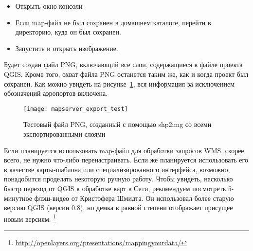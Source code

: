 \begin{itemize}[label=--]
\item Открыть окно консоли
\item Если map-файл не был сохранен в домашнем каталоге, перейти в
директорию, куда он был сохранен.
\item Запустить 
и открыть изображение.
\end{itemize}

Будет создан файл PNG, включающий все слои, содержащиеся в файле проекта
QGIS. Кроме того, охват файла PNG останется таким же, как и когда
проект был сохранен. Как можно увидеть на
рисунке~\ref{fig:mapserver_export_test}, вся информация за исключением
обозначений аэропортов включена.

\begin{figure}[ht]
\centering
  \texttt{[image: mapserver\_export\_test]}
  \caption{Тестовый файл PNG, созданный с помощью shp2img со всеми экспортированными слоями \wincaption}
  \label{fig:mapserver_export_test}
\end{figure}

Если планируется использовать map-файл для обработки запросов WMS,
скорее всего, не нужно что-либо перенастраивать. Если же планируется
использовать его в качестве карты-шаблона или специализированного
интерфейса, возможно, понадобится проделать некоторую ручную работу.
Чтобы увидеть, насколько быстр переход от QGIS к обработке карт в Сети,
рекомендуем посмотреть 5-минутное флэш-видео от Кристофера Шмидта. Он
использовал более старую версию QGIS (версии 0.8), но демка в равной
степени отображает присущее новым версиям.
\footnote{\url{http://openlayers.org/presentations/mappingyourdata/}}

\FloatBarrier
